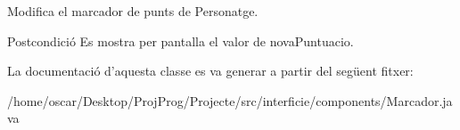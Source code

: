 Modifica el marcador de punts de Personatge. 

\begin{DoxyPostcond}{Postcondició}
Es mostra per pantalla el valor de nova\+Puntuacio. 
\end{DoxyPostcond}


La documentació d'aquesta classe es va generar a partir del següent fitxer\+:\begin{DoxyCompactItemize}
\item 
/home/oscar/\+Desktop/\+Proj\+Prog/\+Projecte/src/interficie/components/Marcador.\+java\end{DoxyCompactItemize}
